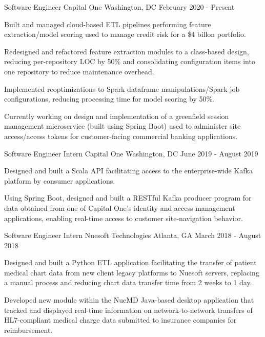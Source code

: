 
\begin{cventries}
  \cventry
    {Software Engineer} %
    {Capital One} %
    {Washington, DC} %
    {February 2020 - Present} %
    {
      \begin{cvitems} %
        \item {Built and managed cloud-based ETL pipelines performing feature extraction/model
        scoring used to manage credit risk for a \$4 billon portfolio.}
        \item {Redesigned and refactored feature extraction modules to a class-based design, reducing
        per-repository LOC by 50\% and consolidating configuration items into one repository to reduce
        maintenance overhead.}
        \item {Implemented reoptimizations to Spark dataframe manipulations/Spark job configurations, reducing
        processing time for model scoring by 50\%.}
        \item {Currently working on design and implementation of a greenfield session management microservice
        (built using Spring Boot) used to administer site access/access tokens for customer-facing commercial banking applications.}
      \end{cvitems}
    }

  \cventry
    {Software Engineer Intern} %
    {Capital One} %
    {Washington, DC} %
    {June 2019 - August 2019} %
    {
      \begin{cvitems} %
        \item {Designed and built a Scala API facilitating access to the enterprise-wide Kafka platform by
        consumer applications.}
        \item {Using Spring Boot, designed and built a RESTful Kafka producer program for data obtained from
        one of Capital One’s identity and access management applications, enabling real-time access
        to customer site-navigation behavior.}
      \end{cvitems}
    }

  \cventry
    {Software Engineer Intern} %
    {Nuesoft Technologies} %
    {Atlanta, GA} %
    {March 2018 - August 2018} %
    {
      \begin{cvitems} %
        \item {Designed and built a Python ETL application facilitating the
        transfer of patient medical chart data from new client legacy platforms to Nuesoft servers, replacing a manual process and reducing chart data transfer time from 2 weeks to 1 day.}
        \item {Developed new module within the NueMD Java-based desktop application that tracked and displayed real-time information on network-to-network transfers of HL7-compliant medical charge data submitted to insurance companies for reimbursement.}
      \end{cvitems}
    }

\end{cventries}
